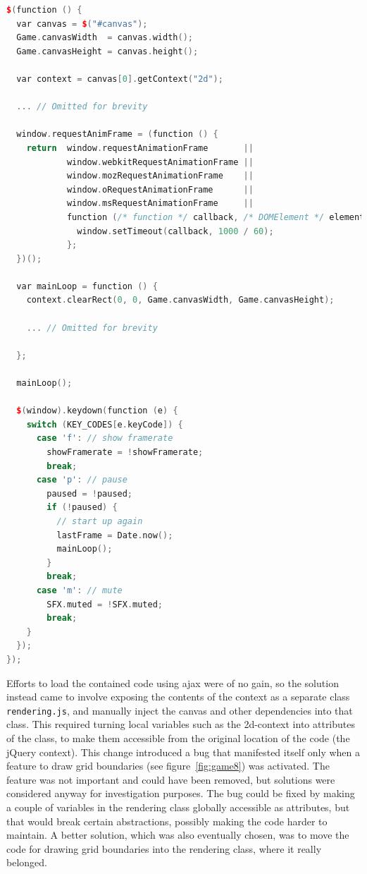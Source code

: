 \documentclass[11pt]{article}
\begin{document}
\begin{lstlisting}[language=C++, keywords={function, var, new, if, else, switch, case, break, return, for}]
$(function () {
  var canvas = $("#canvas");
  Game.canvasWidth  = canvas.width();
  Game.canvasHeight = canvas.height();

  var context = canvas[0].getContext("2d");

  ... // Omitted for brevity

  window.requestAnimFrame = (function () {
    return  window.requestAnimationFrame       ||
            window.webkitRequestAnimationFrame ||
            window.mozRequestAnimationFrame    ||
            window.oRequestAnimationFrame      ||
            window.msRequestAnimationFrame     ||
            function (/* function */ callback, /* DOMElement */ element) {
              window.setTimeout(callback, 1000 / 60);
            };
  })();

  var mainLoop = function () {
    context.clearRect(0, 0, Game.canvasWidth, Game.canvasHeight);

    ... // Omitted for brevity

  };

  mainLoop();

  $(window).keydown(function (e) {
    switch (KEY_CODES[e.keyCode]) {
      case 'f': // show framerate
        showFramerate = !showFramerate;
        break;
      case 'p': // pause
        paused = !paused;
        if (!paused) {
          // start up again
          lastFrame = Date.now();
          mainLoop();
        }
        break;
      case 'm': // mute
        SFX.muted = !SFX.muted;
        break;
    }
  });
});
\end{lstlisting}

Efforts to load the contained code using ajax were of no gain, so the solution instead came to involve exposing the contents of the context as a separate class \texttt{rendering.js}, and manually inject the canvas and other dependencies into that class. This required turning local variables such as the 2d-context into attributes of the class, to make them accessible from the original location of the code (the jQuery context). This change introduced a bug that manifested itself only when a feature to draw grid boundaries (see figure~\ref{fig:game8}) was activated. The feature was not important and could have been removed, but solutions were considered anyway for investigation purposes. The bug could be fixed by making a couple of variables in the rendering class globally accessible as attributes, but that would break certain abstractions, possibly making the code harder to maintain. A better solution, which was also eventually chosen, was to move the code for drawing grid boundaries into the rendering class, where it really belonged.
\end{document}
